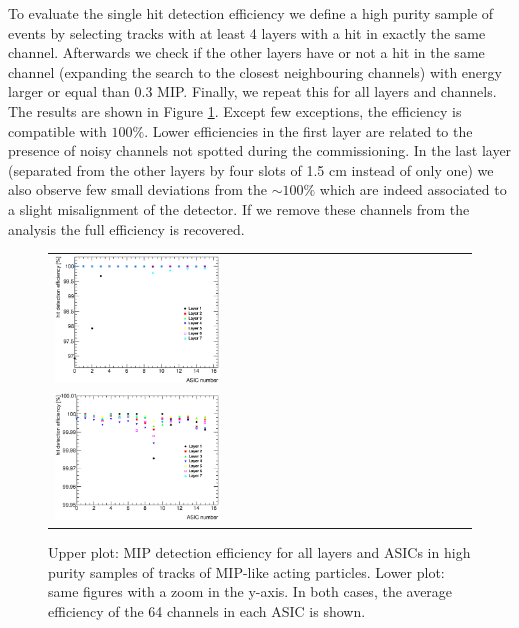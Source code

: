 \documentclass[final,3p,times,twocolumn]{elsarticle}
\begin{document}
To evaluate 
the single hit detection efficiency we define a high purity sample of
events by selecting
tracks with at least 4 layers with a hit in exactly the same channel. Afterwards we 
check if the other layers have or not a hit in the same channel (expanding the search
to the closest neighbouring channels) with energy larger or equal than 0.3 MIP.
Finally, we repeat this for all layers 
and channels. The results are shown in Figure \ref{efficiency}. Except few exceptions, the efficiency is 
compatible with $100\%$.
Lower efficiencies in the first layer are related to the presence of
noisy channels not spotted during the commissioning. In the last layer (separated from the
other layers by four slots of 1.5 cm instead of only one) we also observe few small deviations
from the $\sim100\%$ which are indeed
associated to a slight misalignment of the detector.
If we remove these channels from the analysis
the full efficiency is recovered.

\begin{figure}[!t]
  \centering 
    \begin{tabular}{l}
      \includegraphics[width=0.4\textwidth]{../figs/MIP/efficiency_nhits4_chips.eps} \\
      \includegraphics[width=0.4\textwidth]{../figs/MIP/efficiency_nhits4_chips_zoom.eps} 
    \end{tabular}
    \caption{Upper plot: MIP detection efficiency for all layers and ASICs in high purity samples of tracks of MIP-like acting particles. Lower plot: same figures with a zoom in the y-axis. In both cases, the average efficiency of the 64 channels in each ASIC is shown.}
\label{efficiency}
\end{figure}
\end{document}
